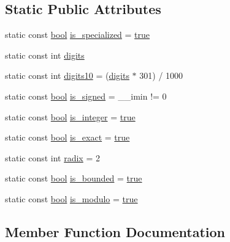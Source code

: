 \subsection*{Static Public Attributes}
\begin{DoxyCompactItemize}
\item 
static const \hyperlink{compiler_8h_abb452686968e48b67397da5f97445f5b}{bool} \hyperlink{class__Integer__limits_a732d0d9a24623f683ec4376516224b69}{is\+\_\+specialized} = \hyperlink{compiler_8h_a41f9c5fb8b08eb5dc3edce4dcb37fee7}{true}
\item 
static const int \hyperlink{class__Integer__limits_a539843efdd6619dc8eee21e29baeb169}{digits}
\item 
static const int \hyperlink{class__Integer__limits_aac7b67f2b1558b99b7de11017d5eee9a}{digits10} = (\hyperlink{class__Integer__limits_a539843efdd6619dc8eee21e29baeb169}{digits} $\ast$ 301) / 1000
\item 
static const \hyperlink{compiler_8h_abb452686968e48b67397da5f97445f5b}{bool} \hyperlink{class__Integer__limits_a645510e27528070df3c346fde42335cb}{is\+\_\+signed} = \+\_\+\+\_\+imin != 0
\item 
static const \hyperlink{compiler_8h_abb452686968e48b67397da5f97445f5b}{bool} \hyperlink{class__Integer__limits_a912f15c4744dcbe94c9c98a09d144c59}{is\+\_\+integer} = \hyperlink{compiler_8h_a41f9c5fb8b08eb5dc3edce4dcb37fee7}{true}
\item 
static const \hyperlink{compiler_8h_abb452686968e48b67397da5f97445f5b}{bool} \hyperlink{class__Integer__limits_a72a8cf71ea00a1e2288b4e98750314e3}{is\+\_\+exact} = \hyperlink{compiler_8h_a41f9c5fb8b08eb5dc3edce4dcb37fee7}{true}
\item 
static const int \hyperlink{class__Integer__limits_a414672a54e911e7cccb52d8d1085d01a}{radix} = 2
\item 
static const \hyperlink{compiler_8h_abb452686968e48b67397da5f97445f5b}{bool} \hyperlink{class__Integer__limits_a35f76560ea89cdd132df7e6b430a6417}{is\+\_\+bounded} = \hyperlink{compiler_8h_a41f9c5fb8b08eb5dc3edce4dcb37fee7}{true}
\item 
static const \hyperlink{compiler_8h_abb452686968e48b67397da5f97445f5b}{bool} \hyperlink{class__Integer__limits_ad253b6f38a22b1584bbacf47fda759b3}{is\+\_\+modulo} = \hyperlink{compiler_8h_a41f9c5fb8b08eb5dc3edce4dcb37fee7}{true}
\end{DoxyCompactItemize}


\subsection{Member Function Documentation}
\hypertarget{class__Integer__limits_a6e40e848c73a41ef3ebce628801fc340}{}
